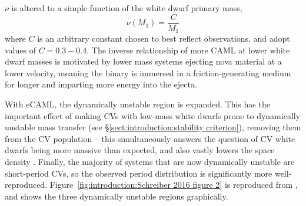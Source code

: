 $\nu$ is altered to a simple function of the white dwarf primary mass,
\begin{equation}
    \label{eqn:introduction:eCAML nu}
    \nu ( M_1 ) = \frac{C}{ M_1 }
\end{equation}
where $C$ is an arbitrary constant chosen to best reflect observations, and \citep{Schreiber2016} adopt values of $C = 0.3 - 0.4$.
The inverse relationship of more CAML at lower white dwarf masses is motivated by lower mass systems ejecting nova material at a lower velocity, meaning the binary is immersed in a friction-generating medium for longer and imparting more energy into the ejecta.

With eCAML, the dynamically unstable region is expanded. This has the important effect of making CVs with low-mass white dwarfs prone to dynamically unstable mass transfer (see \S\ref{sect:introduction:stability criterion}), removing them from the CV population -- this simultaneously answers the question of CV white dwarfs being more massive than expected, and also vastly lowers the space density \citep{belloni2018}. Finally, the majority of systems that are now dynamically unstable are short-period CVs, so the observed period distribution is significantly more well-reproduced. Figure~\ref{fig:introduction:Schreiber 2016 figure 2} is reproduced from \citet{Schreiber2016}, and shows the three dynamically unstable regions graphically.

